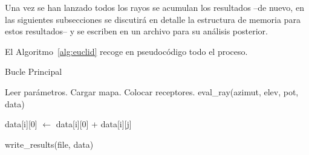 Una vez se han lanzado todos los rayos se acumulan los resultados --de nuevo, en las siguientes subsecciones se discutirá en detalle la estructura de memoria para estos resultados-- y se escriben en un archivo para su análisis posterior.

El Algoritmo~\ref{alg:euclid} recoge en pseudocódigo todo el proceso.







\begin{algorithm}
    \caption{Bucle Principal}
    \label{alg:euclid}
    \begin{algorithmic}[1]
        \State Leer parámetros.
        \State Cargar mapa.
        \State Colocar receptores.
        \For{azimut $\in [0, 360)$}
                \State eval\_ray(azimut, elev, pot, data)
            \EndFor
        \EndFor

                \State data[i][0] $\gets$ data[i][0] + data[i][j]
            \EndFor
        \EndFor

        \State write\_results(file, data)
    \end{algorithmic}
\end{algorithm}


